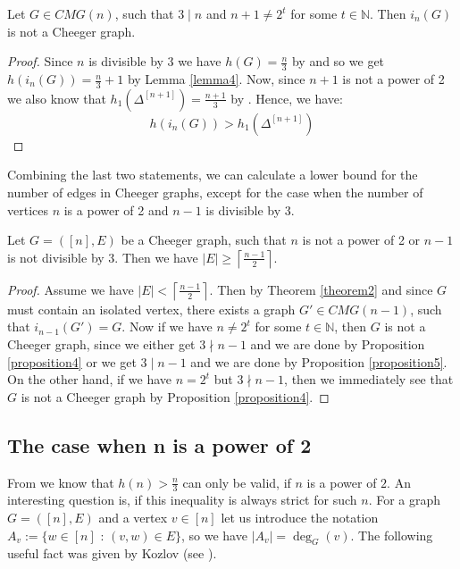 \begin{prop}\label{proposition5}
Let \(G\in CMG(n)\), such that \(3\mid n\) and \(n+1\neq2^t\) for some \(t\in\mathbb{N}\). Then \(i_n(G)\) is not a Cheeger graph.
\begin{proof}
Since \(n\) is divisible by 3 we have \(h(G)=\frac{n}{3}\) by \cite{1} and so we get\\
\(h(i_n(G))=\frac{n}{3}+1\) by Lemma \ref{lemma4}. Now, since \(n+1\) is not a power of 2 we also know that \(h_1(\Delta^{[n+1]})=\frac{n+1}{3}\) by \cite{1}. Hence, we have:
\[
h(i_n(G))>h_1(\Delta^{[n+1]})
\]
\end{proof}
\end{prop}

Combining the last two statements, we can calculate a lower bound for the number of edges in Cheeger graphs, except for the case when the number of vertices \(n\) is a power of 2 and \(n-1\) is divisible by 3.

\begin{prop}
Let \(G=([n],E)\) be a Cheeger graph, such that \(n\) is not a power of 2 or \(n-1\) is not divisible by 3. Then we have \(|E|\geq\left\lceil\frac{n-1}{2}\right\rceil\).
\begin{proof}
Assume we have \(|E|<\left\lceil\frac{n-1}{2}\right\rceil\). Then by Theorem \ref{theorem2} and since \(G\) must contain an isolated vertex, there exists a graph \(G'\in CMG(n-1)\), such that \(i_{n-1}(G')=G\). Now if we have \(n\neq 2^t\) for some \(t\in\mathbb{N}\), then \(G\) is not a Cheeger graph, since we either get \(3\nmid n-1\) and we are done by Proposition \ref{proposition4} or we get \(3\mid n-1\) and we are done by Proposition \ref{proposition5}. On the other hand, if we have \(n=2^t\) but \(3\nmid n-1\), then we immediately see that \(G\) is not a Cheeger graph by Proposition \ref{proposition4}.
\end{proof}
\end{prop}

\subsection{The case when n is a power of 2}

From \cite{1} we know that \(h(n)>\frac{n}{3}\) can only be valid, if \(n\) is a power of \(2\). An interesting question is, if this inequality is always strict for such \(n\). For a graph \(G=([n],E)\) and a vertex \(v\in [n]\) let us introduce the notation \(A_v:=\{w\in [n]\text{ : }(v,w)\in E\}\), so we have \(|A_v|=\deg_G(v)\). The following useful fact was given by Kozlov (see \cite{1}).

